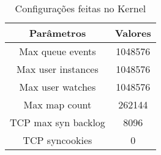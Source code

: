 \begin{table}
  \centering
  \begin{tabular}{|c|c|} \hline
  \textbf{Parâmetros} & \textbf{Valores}\\
    \hline\hline
   Max queue events & 1048576\\
     \hline
   Max user instances & 1048576\\
    \hline
   Max user watches & 1048576\\
    \hline
   Max map count & 262144\\
    \hline
   TCP max syn backlog & 8096\\
    \hline TCP syncookies & 0\\
    \hline
  \end{tabular}

  \caption{Configurações feitas no Kernel}
  \label{tab:kernel_config}
\end{table}

